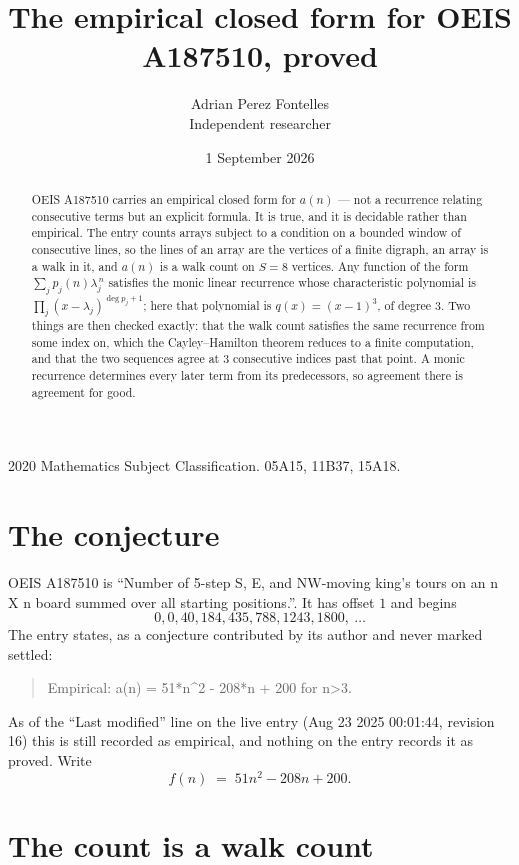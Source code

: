 \documentclass[11pt,a4paper]{article}
\title{The empirical closed form for OEIS A187510, proved}
\author{Adrian Perez Fontelles\\ \small Independent researcher}
\date{1 September 2026}
\theoremstyle{plain}
\theoremstyle{definition}
\begin{document}
\maketitle

\begin{abstract}
OEIS A187510 carries an empirical closed form for $a(n)$ --- not a recurrence relating
consecutive terms but an explicit formula. It is true, and it is decidable rather than
empirical. The entry counts arrays subject to a condition on a bounded window of consecutive lines, so the lines of an array are the
vertices of a finite digraph, an array is a walk in it, and $a(n)$ is a walk count on
$S=8$ vertices. Any function of the form $\sum_j p_j(n)\lambda_j^{\,n}$ satisfies the
monic linear recurrence whose characteristic polynomial is
$\prod_j(x-\lambda_j)^{\deg p_j+1}$; here that polynomial is $q(x)=(x-1)^{3}$, of degree
$3$. Two things are then checked exactly: that the walk count satisfies the same
recurrence from some index on, which the Cayley--Hamilton theorem reduces to a finite
computation, and that the two sequences agree at $3$ consecutive indices past that
point. A monic recurrence determines every later term from its predecessors, so agreement
there is agreement for good.
\end{abstract}

\noindent\small 2020 Mathematics Subject Classification. 05A15, 11B37, 15A18.\normalsize

\section{The conjecture}

OEIS A187510 is ``Number of 5-step S, E, and NW-moving king's tours on an n X n board summed over all starting positions.''. It has offset $1$ and begins
\[
0, 0, 40, 184, 435, 788, 1243, 1800,\ \dots
\]
The entry states, as a conjecture contributed by its author and never marked settled:
\begin{quote}
Empirical: a(n) = 51*n\^{}2 - 208*n + 200 for n>3.
\end{quote}
As of the ``Last modified'' line on the live entry (Aug 23 2025 00:01:44, revision 16) this is still
recorded as empirical, and nothing on the entry records it as proved. Write
\[
f(n)\;=\;51 n^{2} - 208 n + 200.
\]

\section{The count is a walk count}
\end{document}

